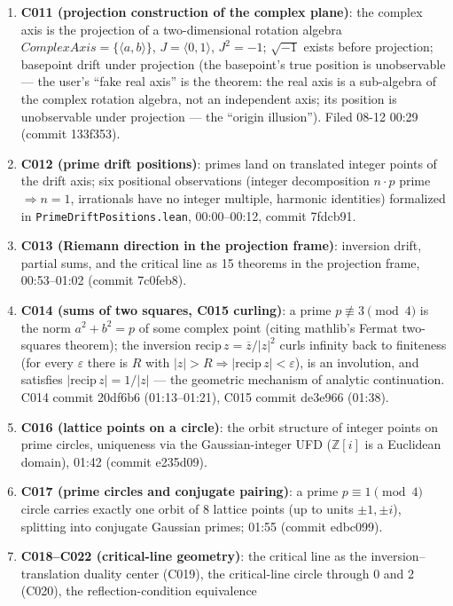 \documentclass[sigplan,10pt,anonymous,review]{acmart}
\begin{document}
\begin{enumerate}
\item \textbf{C011 (projection construction of the complex plane)}: the
complex axis is the projection of a two-dimensional rotation algebra
$ComplexAxis = \{\langle a,b\rangle\}$, $J=\langle0,1\rangle$, $J^2=-1$;
$\sqrt{-1}$ exists before projection; basepoint drift under projection
(the basepoint's true position is unobservable --- the user's ``fake real
axis'' is the theorem: the real axis is a sub-algebra of the complex
rotation algebra, not an independent axis; its position is unobservable
under projection --- the ``origin
illusion''). Filed 08-12 00:29 (commit 133f353).
\item \textbf{C012 (prime drift positions)}: primes land on translated
integer points of the drift axis; six positional observations
(integer decomposition $n\cdot p$ prime $\Rightarrow n=1$, irrationals
have no integer multiple, harmonic identities) formalized in
\texttt{PrimeDriftPositions.lean}, 00:00--00:12, commit 7fdcb91.
\item \textbf{C013 (Riemann direction in the projection frame)}: inversion
drift, partial sums, and the critical line as 15 theorems in the
projection frame, 00:53--01:02 (commit 7c0feb8).
\item \textbf{C014 (sums of two squares, C015 curling)}: a prime
$p \not\equiv 3 \pmod 4$ is the norm $a^2+b^2=p$ of some complex point
(citing mathlib's Fermat two-squares theorem); the inversion
$\mathrm{recip}\, z = \overline z / |z|^2$ curls infinity back to
finiteness (for every $\varepsilon$ there is $R$ with $|z|>R \Rightarrow
|\mathrm{recip}\, z|<\varepsilon$), is an involution, and satisfies
$|\mathrm{recip}\, z| = 1/|z|$ --- the geometric mechanism of analytic
continuation. C014 commit 20df6b6 (01:13--01:21), C015 commit de3e966
(01:38).
\item \textbf{C016 (lattice points on a circle)}: the orbit structure of
integer points on prime circles, uniqueness via the Gaussian-integer UFD
($\mathbb Z[i]$ is a Euclidean domain), 01:42 (commit e235d09).
\item \textbf{C017 (prime circles and conjugate pairing)}: a prime
$p\equiv1 \pmod 4$ circle carries exactly one orbit of 8 lattice points
(up to units $\pm1,\pm i$), splitting into conjugate Gaussian primes;
01:55 (commit edbc099).
\item \textbf{C018--C022 (critical-line geometry)}: the critical line as
the inversion--translation duality center (C019), the critical-line circle
through 0 and 2 (C020), the reflection-condition equivalence

\end{enumerate}
\end{document}

